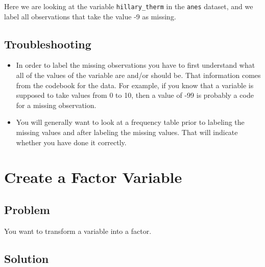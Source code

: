 \documentclass[
]{book}
\newenvironment{Shaded}{\begin{snugshade}}{\end{snugshade}}
\newcommand{\CommentTok}[1]{\textcolor[rgb]{0.56,0.35,0.01}{\textit{#1}}}
\newcommand{\ConstantTok}[1]{\textcolor[rgb]{0.00,0.00,0.00}{#1}}
\newcommand{\DecValTok}[1]{\textcolor[rgb]{0.00,0.00,0.81}{#1}}
\newcommand{\NormalTok}[1]{#1}
\newcommand{\OtherTok}[1]{\textcolor[rgb]{0.56,0.35,0.01}{#1}}
\newcommand{\SpecialCharTok}[1]{\textcolor[rgb]{0.00,0.00,0.00}{#1}}
\providecommand{\tightlist}{%
  \setlength{\itemsep}{0pt}\setlength{\parskip}{0pt}}
\begin{document}
Here we are looking at the variable \texttt{hillary\_therm} in the \texttt{anes} dataset, and we label all observations that take the value -9 as missing.

\begin{Shaded}
\end{Shaded}

\hypertarget{troubleshooting-13}{%
\subsection{Troubleshooting}\label{troubleshooting-13}}

\begin{itemize}
\tightlist
\item
  In order to label the missing observations you have to first understand what all of the values of the variable are and/or should be. That information comes from the codebook for the data. For example, if you know that a variable is supposed to take values from 0 to 10, then a value of -99 is probably a code for a missing observation.
\item
  You will generally want to look at a frequency table prior to labeling the missing values and after labeling the missing values. That will indicate whether you have done it correctly.
\end{itemize}

\hypertarget{factor}{%
\section{Create a Factor Variable}\label{factor}}

\hypertarget{problem-17}{%
\subsection{Problem}\label{problem-17}}

You want to transform a variable into a factor.

\hypertarget{solution-17}{%
\subsection{Solution}\label{solution-17}}
\end{document}
